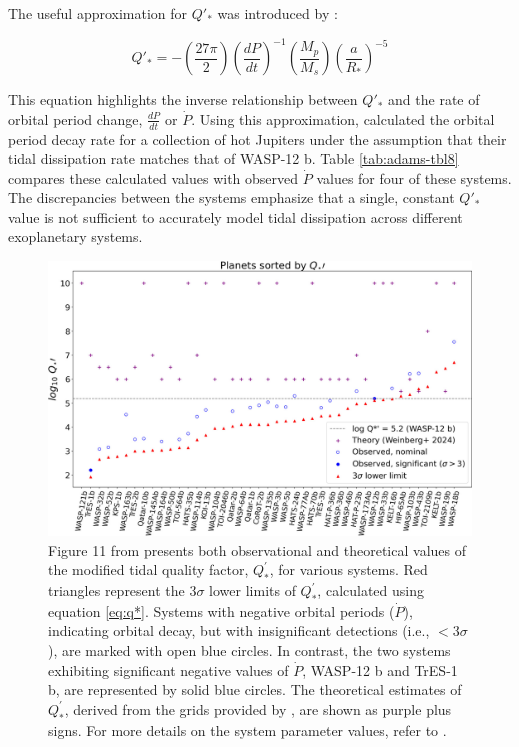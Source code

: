 \documentclass[oneside,12pt]{amsart}
\numberwithin{page}{section}
\begin{document}
The useful approximation for $Q'_*$ was introduced by \citet{goldreich1966q}:

\begin{equation}
    Q'_* = - \left( \frac{27 \pi}{2} \right ) \left( \frac{dP}{dt} \right )^{-1} \left( \frac{M_p}{M_s} \right ) \left( \frac{a}{R_*} \right )^{-5}
\end{equation}\label{eq:q*}

This equation highlights the inverse relationship between $Q'_*$ and the rate of orbital period change, $\frac{dP}{dt}$ or $\dot{P}$. Using this approximation, \citet{adams2024doomed} calculated the orbital period decay rate for a collection of hot Jupiters under the assumption that their tidal dissipation rate matches that of WASP-12 b. Table \ref{tab:adams-tbl8} compares these calculated values with observed $\dot{P}$ values for four of these systems. The discrepancies between the systems emphasize that a single, constant $Q'_*$ value is not sufficient to accurately model tidal dissipation across different exoplanetary systems.

\begin{figure}[htbp]
    \centering
    \includegraphics[width=0.85\linewidth]{figs/adams_fig11.jpg}
    \caption{Figure 11 from \citet{adams2024doomed} presents both observational and theoretical values of the modified tidal quality factor, $Q^{'}_*$, for various systems. Red triangles represent the $3\sigma$ lower limits of $Q^{'}_*$, calculated using equation \ref{eq:q*}. Systems with negative orbital periods ($\dot{P}$), indicating orbital decay, but with insignificant detections (i.e., $<3\sigma$), are marked with open blue circles. In contrast, the two systems exhibiting significant negative values of $\dot{P}$, WASP-12 b and TrES-1 b, are represented by solid blue circles. The theoretical estimates of $Q^{'}_*$, derived from the grids provided by \citet{weinberg2023orbital}, are shown as purple plus signs. For more details on the system parameter values, refer to \citet{adams2024doomed}.}
    \label{fig:adams-fig11}
\end{figure}
\end{document}
